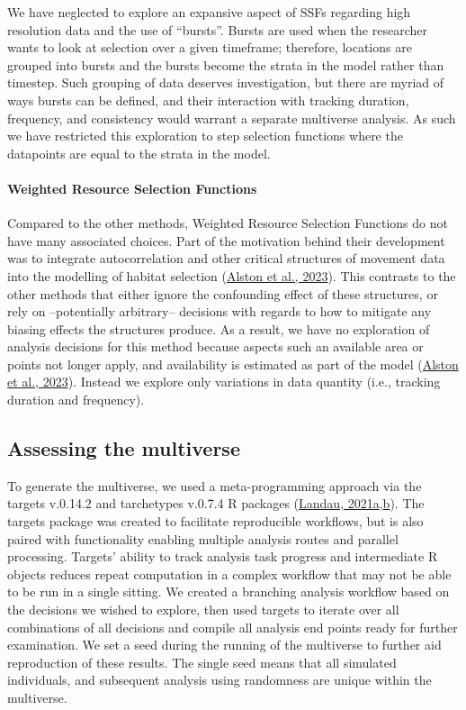 \documentclass[10pt,a4paper]{article}
\begin{document}
We have neglected to explore an expansive aspect of SSFs regarding high resolution data and the use of ``bursts''.
Bursts are used when the researcher wants to look at selection over a given timeframe; therefore, locations are grouped into bursts and the bursts become the strata in the model rather than timestep.
Such grouping of data deserves investigation, but there are myriad of ways bursts can be defined, and their interaction with tracking duration, frequency, and consistency would warrant a separate multiverse analysis.
As such we have restricted this exploration to step selection functions where the datapoints are equal to the strata in the model.

\hypertarget{weighted-resource-selection-functions}{%
\paragraph{Weighted Resource Selection Functions}\label{weighted-resource-selection-functions}}

Compared to the other methods, Weighted Resource Selection Functions do not have many associated choices.
Part of the motivation behind their development was to integrate autocorrelation and other critical structures of movement data into the modelling of habitat selection (\protect\hyperlink{ref-alston_mitigating_2023}{Alston et al., 2023}).
This contrasts to the other methods that either ignore the confounding effect of these structures, or rely on --potentially arbitrary-- decisions with regards to how to mitigate any biasing effects the structures produce.
As a result, we have no exploration of analysis decisions for this method because aspects such an available area or points not longer apply, and availability is estimated as part of the model (\protect\hyperlink{ref-alston_mitigating_2023}{Alston et al., 2023}).
Instead we explore only variations in data quantity (i.e., tracking duration and frequency).

\hypertarget{assessing-the-multiverse}{%
\subsection{Assessing the multiverse}\label{assessing-the-multiverse}}

To generate the multiverse, we used a meta-programming approach via the targets v.0.14.2 and tarchetypes v.0.7.4 R packages (\protect\hyperlink{ref-targets}{Landau, 2021a},\protect\hyperlink{ref-tarchetypes}{b}).
The targets package was created to facilitate reproducible workflows, but is also paired with functionality enabling multiple analysis routes and parallel processing.
Targets' ability to track analysis task progress and intermediate R objects reduces repeat computation in a complex workflow that may not be able to be run in a single sitting.
We created a branching analysis workflow based on the decisions we wished to explore, then used targets to iterate over all combinations of all decisions and compile all analysis end points ready for further examination.
We set a seed during the running of the multiverse to further aid reproduction of these results.
The single seed means that all simulated individuals, and subsequent analysis using randomness are unique within the multiverse.
\end{document}
